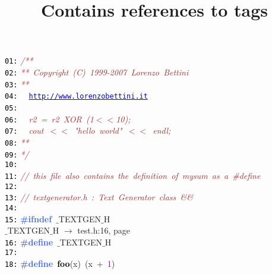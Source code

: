 \documentclass{article}
\title{Contains references to tags}
\date{}
\begin{document}
\maketitle
\noindent
\mbox{}\texttt{\textcolor{Black}{01:}} \textit{\textcolor{Brown}{/**}} \\
\mbox{}\texttt{\textcolor{Black}{02:}} \textit{\textcolor{Brown}{**\ Copyright\ (C)\ 1999-2007\ Lorenzo\ Bettini}} \\
\mbox{}\texttt{\textcolor{Black}{03:}} \textit{\textcolor{Brown}{**\ \ }} \\
\mbox{}\texttt{\textcolor{Black}{04:}} \textit{\textcolor{Brown}{\ \ }}\underline{\texttt{\textcolor{Blue}{http://www.lorenzobettini.it}}} \\
\mbox{}\texttt{\textcolor{Black}{05:}} \textit{\textcolor{Brown}{\ \ }} \\
\mbox{}\texttt{\textcolor{Black}{06:}} \textit{\textcolor{Brown}{\ \ r2\ =\ r2\ XOR\ (1$<$$<$10);}} \\
\mbox{}\texttt{\textcolor{Black}{07:}} \textit{\textcolor{Brown}{\ \ cout\ $<$$<$\ "{}hello\ world"{}\ $<$$<$\ endl;}} \\
\mbox{}\texttt{\textcolor{Black}{08:}} \textit{\textcolor{Brown}{**\ \ }} \\
\mbox{}\texttt{\textcolor{Black}{09:}} \textit{\textcolor{Brown}{*/}} \\
\mbox{}\texttt{\textcolor{Black}{10:}}  \\
\mbox{}\texttt{\textcolor{Black}{11:}} \textit{\textcolor{Brown}{//\ this\ file\ also\ contains\ the\ definition\ of\ mysum\ as\ a\ \#define}} \\
\mbox{}\texttt{\textcolor{Black}{12:}}  \\
\mbox{}\texttt{\textcolor{Black}{13:}} \textit{\textcolor{Brown}{//\ textgenerator.h\ :\ Text\ Generator\ class\ \&\&}} \\
\mbox{}\texttt{\textcolor{Black}{14:}}  \\
\mbox{}\texttt{\textcolor{Black}{15:}} \textbf{\textcolor{RoyalBlue}{\#ifndef}}\ $\_$TEXTGEN$\_$H \\
\mbox{}{\hfill $\_$TEXTGEN$\_$H $\rightarrow$ test.h:16, page~\pageref{test.h:16}} \\
\mbox{}\texttt{\textcolor{Black}{16:}} \textbf{\textcolor{RoyalBlue}{\#define}}\ \label{test.h:16}$\_$TEXTGEN$\_$H \\
\mbox{}\texttt{\textcolor{Black}{17:}}  \\
\mbox{}\texttt{\textcolor{Black}{18:}} \textbf{\textcolor{RoyalBlue}{\#define}}\ \textbf{\textcolor{Black}{\label{test.h:18}foo}}\textcolor{BrickRed}{(}x\textcolor{BrickRed}{)}\ \textcolor{BrickRed}{(}x\ \textcolor{BrickRed}{+}\ \textcolor{Purple}{1}\textcolor{BrickRed}{)} \\
\end{document}
